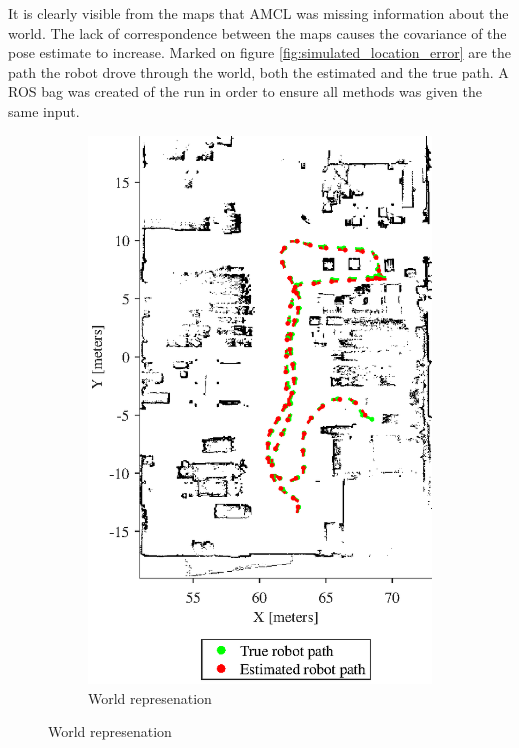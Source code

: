 It is clearly visible from the maps that AMCL was missing information about the world. The lack of correspondence between the maps causes the covariance of the pose estimate to increase.
Marked on figure \vref{fig:simulated_location_error} are the path the robot drove through the world, both the estimated and the true path.
A ROS bag was created of the run in order to ensure all methods was given the same input. 

\begin{figure}[htbp]
	\centering
	\begin{subfigure}[t]{0.45\textwidth}
		\includegraphics[width=\textwidth]{figures/static_mapping/simulation_poses_stage_map}
		\caption{World represenation}

\end{subfigure}
\end{figure}
